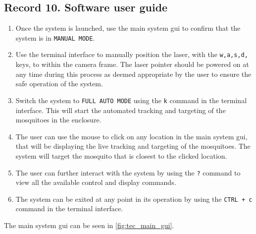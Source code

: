 \subsection{Record 10. Software user guide}\label{subsec:software_user_guide}
\begin{enumerate}
  \item Once the system is launched, use the main system \gls{gui} to confirm that the system is in \texttt{MANUAL MODE}.
  \item Use the terminal interface to manually position the laser, with the \texttt{w,a,s,d,} keys, to within the camera frame. The laser pointer should be powered on at any time during this process as deemed appropriate by the user to ensure the safe operation of the system.
  \item Switch the system to \texttt{FULL AUTO MODE} using the \texttt{k} command in the terminal interface. This will start the automated tracking and targeting of the mosquitoes in the enclosure.
  \item The user can use the mouse to click on any location in the main system \gls{gui}, that will be displaying the live tracking and targeting of the mosquitoes. The system will target the mosquito that is closest to the clicked location.
  \item The user can further interact with the system by using the \texttt{?} command to view all the available control and display commands.
  \item The system can be exited at any point in its operation by using the \texttt{CTRL\,+\,c} command in the terminal interface.
\end{enumerate}

The main system \gls{gui} can be seen in \autoref{fig:tec_main_gui}.




